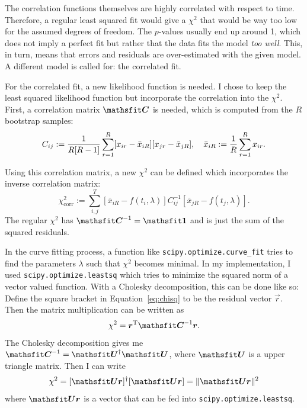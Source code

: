 \documentclass[11pt, english, fleqn, DIV=10, headinclude]{scrartcl}
\begin{document}
The correlation functions themselves are highly correlated with respect to
time. Therefore, a regular least squared fit would give a $\chi^2$ that would
be way too low for the assumed degrees of freedom. The $p$-values usually end
up around 1, which does not imply a perfect fit but rather that the data fits
the model \emph{too well}. This, in turn, means that errors and residuals are
over-estimated with the given model. A different model is called for: the
correlated fit.

For the correlated fit, a new likelihood function is needed. I chose to keep
the least squared likelihood function but incorporate the correlation into the
$\chi^2$. First, a correlation matrix $\tens C$ is needed, which is computed
from the $R$ bootstrap samples:
\begin{equation}
    \label{eq:correlation_matrix}
    C_{ij} := \frac{1}{R[R-1]} \sum_{r=1}^R
    [x_{ir} - \bar x_{iR}] [x_{jr} - \bar x_{jR}]
    ,\quad
    \bar x_{iR} := \frac 1R \sum_{r=1}^R x_{ir}.
\end{equation}

Using this correlation matrix, a new $\chi^2$ can be defined which incorporates
the inverse correlation matrix:
\begin{equation}
    \label{eq:chisq}
    \chi^2_\text{corr} := \sum_{i, j}^T
    \left[ \bar x_{iR} - f(t_i, \lambda) \right]
    C^{-1}_{ij}
    \left[ \bar x_{jR} - f(t_j, \lambda) \right].
\end{equation}
The regular $\chi^2$ has $\tens C^{-1} = \tens 1$ and is just the sum of the
squared residuals.

In the curve fitting process, a function like
\texttt{scipy.optimize.curve\_fit} tries to find the parameters $\lambda$ such
that $\chi^2$ becomes minimal. In my implementation, I used
\texttt{scipy.optimize.leastsq} which tries to minimize the squared norm of a
vector valued function. With a Cholesky decomposition, this can be done like
so: Define the square bracket in Equation~\eqref{eq:chisq} to be the residual
vector $\vec r$. Then the matrix multiplication can be written as
\begin{equation}
    \chi^2 = \vec r^\text T \tens C^{-1} \vec r.
\end{equation}
The Cholesky decomposition gives me $\tens C^{-1} = \tens U^\dagger \tens U$,
where $\tens U$ is a upper triangle matrix. Then I can write
\begin{equation}
    \chi^2 = [\tens U \vec r]^\dagger [\tens U \vec r]
    = \| \tens U \vec r \|^2
\end{equation}
where $\tens U \vec r$ is a vector that can be fed into
\texttt{scipy.optimize.leastsq}.
\end{document}
